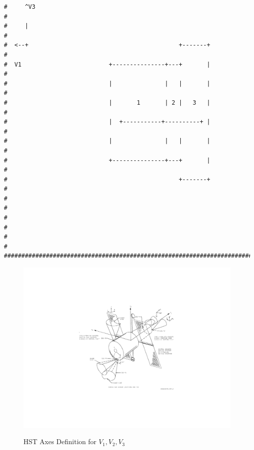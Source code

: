 \documentclass[onecolumn,10pt]{jhwhw}
\begin{document}
\begin{lstlisting}
#     ^V3                                                                               #
#     |                                                                                 #
#  <--+                                           +-------+                             #
#  V1                         +---------------+---+       |                             #
#                             |               |   |       |                             #
#                             |       1       | 2 |   3   |                             #
#                             |  +-----------+----------+ |                             #
#                             |               |   |       |                             #
#                             +---------------+---+       |                             #
#                                                 +-------+                             #
#                                                                                       #
#                                                                                       #
#                                                                                       #
#########################################################################################
\end{lstlisting}
\clearpage

\begin{figure}[h!]
\begin{center}
\includegraphics[height=0.5\textheight]{hst_axes.pdf}
\label{fig:on}
\end{center}
\caption{HST Axes Definition for $V_1, V_2, V_3$}
\end{figure}
\end{document}
